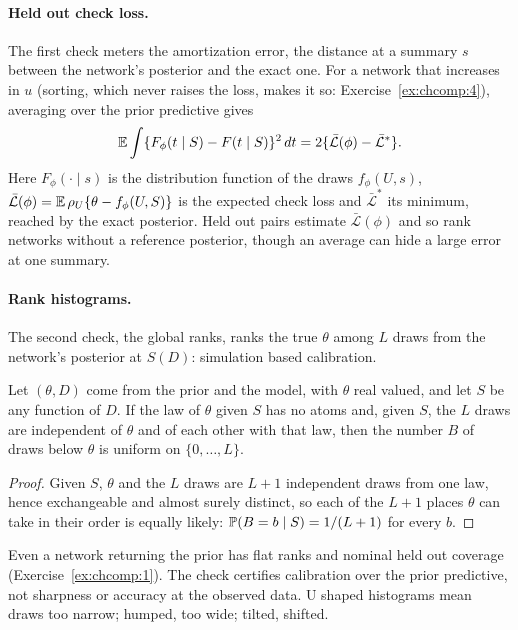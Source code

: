 \paragraph{Held out check loss.} The first check meters the amortization error, the distance at a summary $s$ between the network's posterior and the exact one. For a network that increases in $u$ (sorting, which never raises the loss, makes it so: Exercise~\ref{ex:chcomp:4}), averaging over the prior predictive gives
\begin{equation}\label{comp:eq:amortization}
\mathbb{E}\int \{F_\phi(t \mid S) - F(t \mid S)\}^2\,dt = 2\{\bar{\mathcal L}(\phi) - \bar{\mathcal L}^\ast\}.
\end{equation}
Here $F_\phi(\cdot\mid s)$ is the distribution function of the draws $f_\phi(U,s)$, $\bar{\mathcal L}(\phi)=\mathbb{E}\,\rho_U\{\theta-f_\phi(U,S)\}$ is the expected check loss and $\bar{\mathcal L}^\ast$ its minimum, reached by the exact posterior. Held out pairs estimate $\bar{\mathcal L}(\phi)$ and so rank networks without a reference posterior, though an average can hide a large error at one summary.

\paragraph{Rank histograms.} The second check, the global ranks, ranks the true $\theta$ among $L$ draws from the network's posterior at $S(D)$: simulation based calibration.

\begin{proposition}\label{comp:prop:ranks}
Let $(\theta, D)$ come from the prior and the model, with $\theta$ real valued, and let $S$ be any function of $D$. If the law of $\theta$ given $S$ has no atoms and, given $S$, the $L$ draws are independent of $\theta$ and of each other with that law, then the number $B$ of draws below $\theta$ is uniform on $\{0, \dots, L\}$.
\end{proposition}
\begin{proof}
Given $S$, $\theta$ and the $L$ draws are $L + 1$ independent draws from one law, hence exchangeable and almost surely distinct, so each of the $L + 1$ places $\theta$ can take in their order is equally likely: $\mathbb{P}(B = b \mid S) = 1/(L + 1)$ for every $b$.
\end{proof}

Even a network returning the prior has flat ranks and nominal held out coverage (Exercise~\ref{ex:chcomp:1}). The check certifies calibration over the prior predictive, not sharpness or accuracy at the observed data. U shaped histograms mean draws too narrow; humped, too wide; tilted, shifted.

